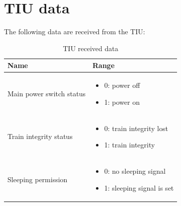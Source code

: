 \documentclass[nocc]{template/openetcs_report}
\begin{document}
\chapter{TIU data}
\label{tiu_data}
The following data are received from the TIU:
			\begin{longtable}{|l|l|}
				\caption{TIU received data}\\ 
				\hline
					\begin{minipage}[t]{0.5\linewidth} \textbf{Name}	\end{minipage} 
				&	\begin{minipage}[t]{0.5\linewidth} \textbf{Range} \end{minipage} \\
				
				\hline
					\begin{minipage}[t]{0.5\linewidth} Main power switch status	\end{minipage} 
				&	\begin{minipage}[t]{0.5\linewidth}
						\begin{itemize}
							\item 0: power off
							\item 1: power on
						\end{itemize}
					\end{minipage} \\
					
				\hline
				\begin{minipage}[t]{0.5\linewidth} Train integrity status	\end{minipage} 
				&	\begin{minipage}[t]{0.5\linewidth}
						\begin{itemize}
							\item 0: train integrity lost
							\item 1: train integrity
						\end{itemize}
					\end{minipage} \\
				\hline
				\begin{minipage}[t]{0.5\linewidth} Sleeping permission\end{minipage} 
				&	\begin{minipage}[t]{0.5\linewidth}
						\begin{itemize}
							\item 0: no sleeping signal
							\item 1: sleeping signal is set
						\end{itemize}
					\end{minipage} \\


\end{longtable}
\end{document}
